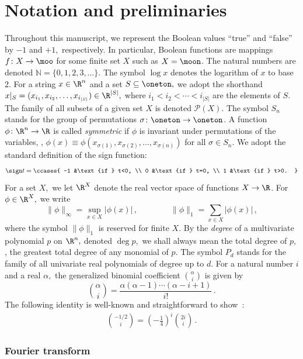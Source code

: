 \section{Notation and preliminaries}
\label{sec:prelim}

Throughout this manuscript, we represent the Boolean
values ``true'' and ``false'' by $-1$ and $+1,$
respectively. In particular, Boolean functions are
mappings $f\colon X\to\moo$ for some finite set $X$
such as $X=\moon$. The natural numbers are denoted
$\mathbb N=\{0,1,2,3,\dots\}$. The symbol $\log x$
denotes the logarithm of $x$ to base~$2$.
For a string $x\in\R^n$ and a set $S\subseteq\oneton,$
we adopt the shorthand
$x|_S=(x_{i_1},x_{i_2},\dots,x_{i_{|S|}})\in\R^{|S|},$
where $i_1<i_2<\cdots<i_{|S|}$ are the elements of $S$. 
The family of all subsets of a given set $X$ is denoted
$\mathcal{P}(X)$. The symbol $S_n$ stands for the group
of permutations $\sigma\colon\oneton\to\oneton$. A
function
$\phi\colon\R^n\to\R$ is called \emph{symmetric}
if $\phi$ is invariant under permutations of the
variables, \ie, $\phi(x)\equiv
\phi(x_{\sigma(1)},x_{\sigma(2)},\dots,x_{\sigma(n)})$
for all $\sigma\in S_n$. 
We adopt the standard definition
of the sign function:
\begin{align*}
  \sign t = 
  \ccases{
  -1 &\text{if } t<0, \\
  0  &\text{if } t=0, \\
  1 &\text{if } t>0.
  }
\end{align*}
For a set $X,$ we let $\R^X$ denote the real vector
space of functions $X\to\R$. For $\phi\in\R^X,$ 
we write
\[
\|\phi\|_\infty =\sup_{x\in X} |\phi(x)|\,, 
\qquad\qquad \|\phi\|_1=\sum_{x\in X} |\phi(x)|\,,
\]
where the symbol $\|\phi\|_1$ is reserved for finite
$X$. By the \emph{degree} of a multivariate polynomial $p$
on $\R^n,$ denoted $\deg p,$ we shall always mean the
total degree of $p$, \ie, the greatest total degree of
any monomial of $p$. The symbol $P_d$ stands for the
family of all univariate real polynomials of degree up
to $d$. 
For a natural number $i$ and a real $\alpha,$ the
generalized binomial coefficient ${\alpha\choose i}$ is
given by \[{\alpha\choose
i}=\frac{\alpha(\alpha-1)\cdots(\alpha-i+1)}{i!}\,.\]
The following identity is well-known and straightforward to
show~\cite[p.~186]{concrete-math}:
\begin{align}
{-1/2\choose i}=\left(-\frac14\right)^i{2i\choose i}\,.
\label{eqn:gen-binom}
\end{align}

 
\subsubsection*{Fourier transform}

